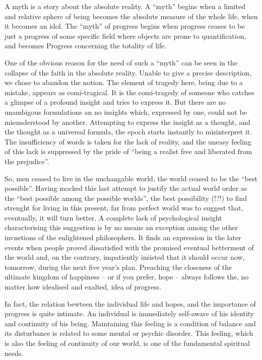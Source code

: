 A myth is a story about the absolute reality.
A ``myth'' begins when a limited and relative sphere of being becomes the 
absolute measure of the whole life, when it becomes an idol.
The ``myth'' of progress begins when progress ceases to be just a progress
of some specific field where objects are prone to quantification, and becomes
Progress concerning the totality of life.

One of the obvious reason for the need of such a ``myth'' can be seen in the 
collapse of the faith in the absolute reality. Unable to give a precise description,
we chose to abandon the notion.
The element of tragedy here, being due to a mistake, appears as 
comi-tragical. It is the comi-tragedy of someone who catches a glimpse of a 
profound insight and tries to express it. But there are no unambigous 
formulations an no insights which, expressed by one, could not be misunderstood
by another. Attempting to express the insight as a thought, and the thought as a
universal formula, the epoch starts instantly to misinterpret it. The insufficiency 
of words is taken for the lack of reality, and
the uneasy feeling of this lack is suppressed by the 
pride of ``being a realist free and liberated from the prejudice''.

So, men ceased to live in the 
unchangable world, the world ceased to be the ``best possible''.
Having mocked this last attempt to justify the actual world order as
the ``best possible among the possible worlds'', the best possibility (!?!)
 to find strenght for living in this present, far from perfect
world was to suggest that, eventually, it will turn better. 
A complete lack of psychological insight characterising this suggestion is by
no means an exception among the other invnetions of the enlightened 
philosophers. It finds an expression in the later events when people proved
dissatisfied with the promised eventual betterment of the world and, on the contrary,
impatiently insisted that it should occur now, tomorrow, during the next five
year's plan. Preaching the closeness of the ultimate kingdom of happiness 
-- or if you prefer, hope --
always follows the, no matter how idealised and exalted, idea of progress.

In fact, the relation bewteen the individual life and hopes, and the importance
of progress is quite intimate. An individual is immediately self-aware of his
identity and continuity of his being. Maintaining this feeling is a condition
of balance and its disturbance is related to
some mental or psychic disorder. This feeling, which is also the feeling
of continuity of our world, is one of the fundamental spiritual needs.

